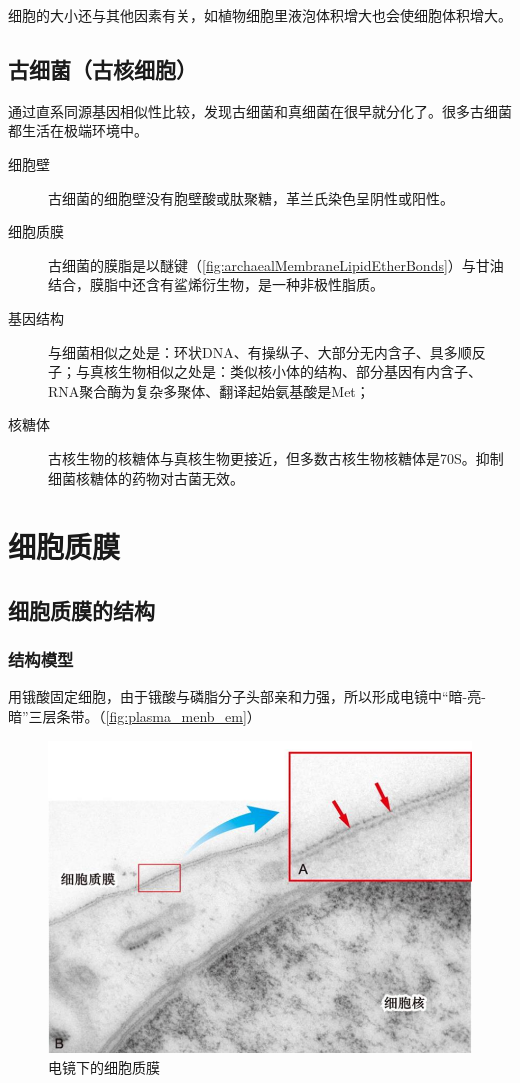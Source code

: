 细胞的大小还与其他因素有关，如植物细胞里液泡体积增大也会使细胞体积增大。

\subsection{古细菌（古核细胞）}

通过直系同源基因相似性比较，发现古细菌和真细菌在很早就分化了。很多古细菌都生活在极端环境中。



\begin{description}
	\item[细胞壁] 古细菌的细胞壁没有胞壁酸或肽聚糖，革兰氏染色呈阴性或阳性。
	\item[细胞质膜] 古细菌的膜脂是以醚键（\autoref{fig:archaealMembraneLipidEtherBonds}）与甘油结合，膜脂中还含有鲨烯衍生物，是一种非极性脂质。
	\item[基因结构] 与细菌相似之处是：环状DNA、有操纵子、大部分无内含子、具多顺反子；与真核生物相似之处是：类似核小体的结构、部分基因有内含子、RNA聚合酶为复杂多聚体、翻译起始氨基酸是Met；
	\item[核糖体] 古核生物的核糖体与真核生物更接近，但多数古核生物核糖体是70S。抑制细菌核糖体的药物对古菌无效。
\end{description}

\section{细胞质膜}

\subsection{细胞质膜的结构}

\subsubsection{结构模型}

用锇酸固定细胞，由于锇酸与磷脂分子头部亲和力强，所以形成电镜中“暗-亮-暗”三层条带。（\autoref{fig:plasma_menb_em}）

\begin{figure}[htbp]
	\centering
	\includegraphics[width=0.5\linewidth]{Pics/电镜下的细胞质膜}
	\caption{电镜下的细胞质膜}
	\label{fig:plasma_menb_em}
\end{figure}

